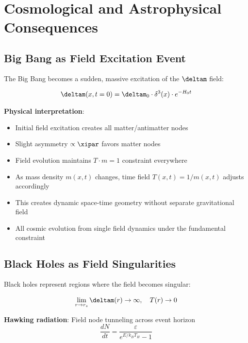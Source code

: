 	\section{Cosmological and Astrophysical Consequences}
	
	\subsection{Big Bang as Field Excitation Event}
	
	The Big Bang becomes a sudden, massive excitation of the $\deltam$ field:
	
	\begin{equation}
		\deltam(x,t=0) = \deltam_0 \cdot \delta^3(x) \cdot e^{-H_0 t}
	\end{equation}
	
	\textbf{Physical interpretation}:
	\begin{itemize}
		\item Initial field excitation creates all matter/antimatter nodes
		\item Slight asymmetry $\propto \xipar$ favors matter nodes
		\item Field evolution maintains $T \cdot m = 1$ constraint everywhere
		\item As mass density $m(x,t)$ changes, time field $T(x,t) = 1/m(x,t)$ adjusts accordingly
		\item This creates dynamic space-time geometry without separate gravitational field
		\item All cosmic evolution from single field dynamics under the fundamental constraint
	\end{itemize}
	
	\subsection{Black Holes as Field Singularities}
	
	Black holes represent regions where the field becomes singular:
	
	\begin{equation}
		\lim_{r \to r_s} \deltam(r) \to \infty, \quad T(r) \to 0
	\end{equation}
	
	\textbf{Hawking radiation}: Field node tunneling across event horizon
	\begin{equation}
		\frac{dN}{dt} = \frac{\varepsilon}{e^{E/k_B T_H} - 1}
	\end{equation}
	
